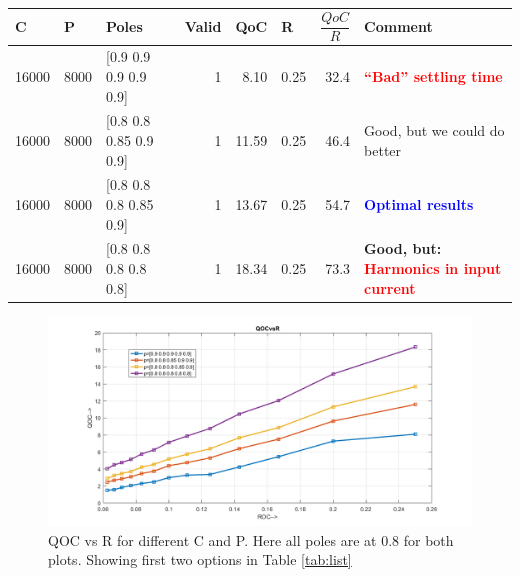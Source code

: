\begin{enumerate}
		\begin{table}[htbp]
			\caption{}
			\begin{tabular}{rrlrrrrl}
				\toprule
				\multicolumn{1}{l}{C} & \multicolumn{1}{l}{P} & Poles & \multicolumn{1}{l}{Valid} & \multicolumn{1}{l}{QoC} & \multicolumn{1}{l}{R} & \multicolumn{1}{l}{$\dfrac{QoC}{R}$  } & Comment \\ 
				\midrule
				16000 & 8000 & [0.9 0.9 0.9 0.9 0.9] & 1 & 8.10 & 0.25 & 32.4 & \textcolor{red}{\textbf{“Bad” settling time}} \\ 
				16000 & 8000 & [0.8 0.8 0.85 0.9 0.9] & 1 & 11.59 & 0.25 & 46.4 & Good, but we could do better \\ 
				16000 & 8000 & [0.8 0.8 0.8 0.85 0.9] & 1 & 13.67 & 0.25 & 54.7 & \textcolor{blue}{\textbf{Optimal results}} \\ 
				16000 & 8000 & [0.8 0.8 0.8 0.8 0.8] & 1 & 18.34 & 0.25 & 73.3 & \textbf{Good, but: \textcolor{red}{Harmonics in input current}} \\ 
				\midrule
			\end{tabular}
			\label{tab:poles}
		\end{table}
\end{enumerate}

\begin{figure}[h]
	\begin{center}
		\includegraphics[width=\linewidth]{img/q2}
		\caption{QOC vs R for different C and P. Here all poles are at 0.8 for both plots. Showing first two options in Table \ref{tab:list}}
		\label{fig:qoc2}
	\end{center}
\end{figure}